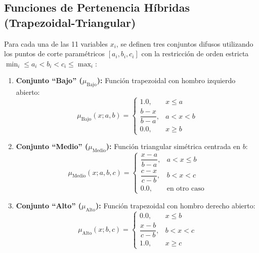 \documentclass[11pt,a4paper]{article}
\begin{document}
\subsection{Funciones de Pertenencia Híbridas (Trapezoidal-Triangular)}
Para cada una de las 11 variables $x_i$, se definen tres conjuntos difusos utilizando los puntos de corte paramétricos $[a_i, b_i, c_i]$ con la restricción de orden estricta $\min_i \le a_i < b_i < c_i \le \max_i$:
\begin{enumerate}
    \item \textbf{Conjunto ``Bajo'' ($\mu_{\text{Bajo}}$):} Función trapezoidal con hombro izquierdo abierto:
    \begin{equation}
    \mu_{\text{Bajo}}(x; a, b) = \begin{cases}
    1.0, & x \le a \\
    \dfrac{b - x}{b - a}, & a < x < b \\
    0.0, & x \ge b
    \end{cases}
    \end{equation}
    \item \textbf{Conjunto ``Medio'' ($\mu_{\text{Medio}}$):} Función triangular simétrica centrada en $b$:
    \begin{equation}
    \mu_{\text{Medio}}(x; a, b, c) = \begin{cases}
    \dfrac{x - a}{b - a}, & a < x \le b \\
    \dfrac{c - x}{c - b}, & b < x < c \\
    0.0, & \text{en otro caso}
    \end{cases}
    \end{equation}
    \item \textbf{Conjunto ``Alto'' ($\mu_{\text{Alto}}$):} Función trapezoidal con hombro derecho abierto:
    \begin{equation}
    \mu_{\text{Alto}}(x; b, c) = \begin{cases}
    0.0, & x \le b \\
    \dfrac{x - b}{c - b}, & b < x < c \\
    1.0, & x \ge c
    \end{cases}
    \end{equation}
\end{enumerate}
\end{document}
